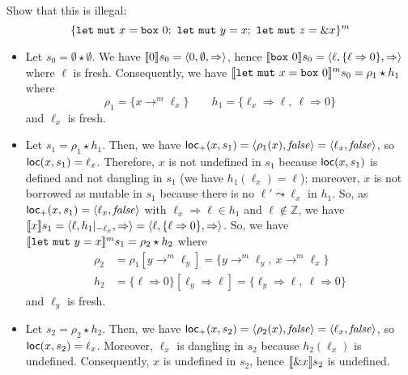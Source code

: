 \begin{example}
  Show that this is illegal:
  \[
    \{
      \mathtt{let\ mut}\ x = \mathtt{box}\ 0;\
      \mathtt{let\ mut}\ y = x;\
      \mathtt{let\ mut}\ z = \borrow x
    \}^m
  \]
  \begin{itemize}
    \item Let $s_0=\emptyset \star \emptyset$.
    We have $\den[0]{s_0} = \langle 0,\emptyset,\Rightarrow\rangle$, hence
    $\den[\mathtt{box}\ 0]{s_0} =
    \langle\ell,\{\ell\Rightarrow 0\},\Rightarrow\rangle$ where $\ell$ is fresh.
    Consequently, we have
    $\denl[\mathtt{let\ mut}\ x = \mathtt{box}\ 0]{m}{s_0} = \rho_1 \star h_1$
    where
    \[\rho_1=\{x\to^m\ell_x\} \qquad
    h_1 = \{\ell_x\Rightarrow \ell,\ \ell\Rightarrow 0\}\]
    and $\ell_x$ is fresh.
    \item Let $s_1 = \rho_1 \star h_1$.
    Then, we have $\locread(x,s_1)=\langle\rho_1(x),\mathit{false}\rangle=
    \langle\ell_x,\mathit{false}\rangle$, so $\loc(x,s_1) = \ell_x$.
    Therefore, $x$ is not undefined in $s_1$ because $\loc(x,s_1)$ is defined
    and not dangling in $s_1$ (we have $h_1(\ell_x)=\ell$); moreover, $x$ is
    not borrowed as mutable in $s_1$ because there is no $\ell'\leadsto\ell_x$
    in $h_1$.
    So, as $\locread(x,s_1) = \langle\ell_x,\mathit{false}\rangle$ with
    $\ell_x\Rightarrow \ell\in h_1$ and $\ell\not\in\mathbb{Z}$,
    we have $\den[x]{s_1} = \langle \ell, h_1|_{-\ell_x}, \Rightarrow\rangle=
    \langle \ell, \{\ell\Rightarrow 0\}, \Rightarrow\rangle$.
    So, we have
    $\denl[\mathtt{let\ mut}\ y = x]{m}{s_1} = \rho_2 \star h_2$ where
    \begin{align*}
      \rho_2 & = \rho_1[y\to^m\ell_y] = \{y\to^m\ell_y,\ x\to^m\ell_x\}\\
      h_2 & = \{\ell\Rightarrow 0\}[\ell_y\Rightarrow \ell] =
      \{\ell_y\Rightarrow \ell,\ \ell\Rightarrow 0\}
    \end{align*}
    and $\ell_y$ is fresh.
    \item Let $s_2 = \rho_2 \star h_2$.
    Then, we have $\locread(x,s_2)=\langle\rho_2(x),\mathit{false}\rangle=
    \langle\ell_x,\mathit{false}\rangle$, so $\loc(x,s_2) = \ell_x$. Moreover,
    $\ell_x$ is dangling in $s_2$ because $h_2(\ell_x)$ is undefined.
    Consequently, $x$ is undefined in $s_2$, hence $\den[\borrow x]{s_2}$
    is undefined.
  \end{itemize}
\end{example}

